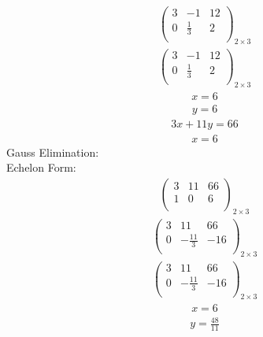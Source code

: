 \documentclass{article}
\begin{document}
\begin{align*}
\left(
\begin{array}{cc|c}
3 & -1 & 12\\
0 & \frac{1}{3} & 2\\
\end{array}
\right)_{2\times 3}
\end{align*}
\begin{align*}
\left(
\begin{array}{cc|c}
3 & -1 & 12\\
0 & \frac{1}{3} & 2\\
\end{array}
\right)_{2\times 3}
\end{align*}
\begin{align*}
x=6\end{align*}
\begin{align*}
y=6\end{align*}
\begin{align*}
3x + 11y=66\end{align*}
\begin{align*}
x=6\end{align*}
Gauss Elimination:\\
Echelon Form:\\
\begin{align*}
\left(
\begin{array}{cc|c}
3 & 11 & 66\\
1 & 0 & 6\\
\end{array}
\right)_{2\times 3}
\end{align*}
\begin{align*}
\left(
\begin{array}{cc|c}
3 & 11 & 66\\
0 & -\frac{11}{3} & -16\\
\end{array}
\right)_{2\times 3}
\end{align*}
\begin{align*}
\left(
\begin{array}{cc|c}
3 & 11 & 66\\
0 & -\frac{11}{3} & -16\\
\end{array}
\right)_{2\times 3}
\end{align*}
\begin{align*}
x=6\end{align*}
\begin{align*}
y=\frac{48}{11}\end{align*}
\end{document}
